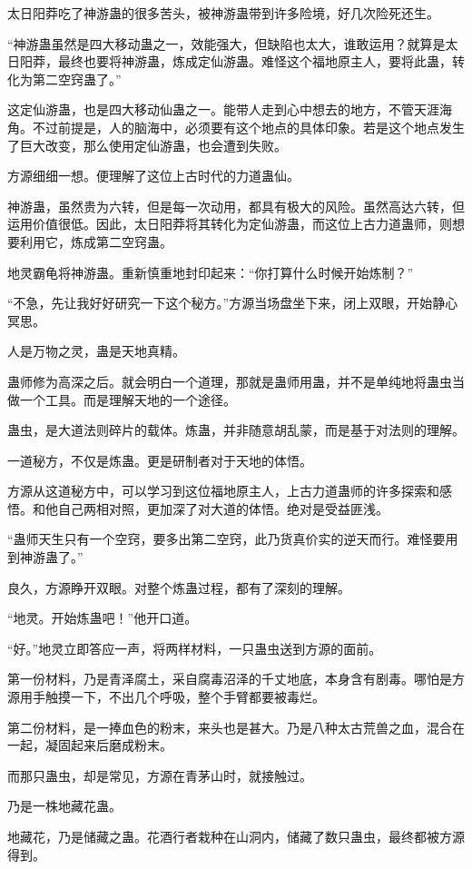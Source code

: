 \begin{this_body}
太日阳莽吃了神游蛊的很多苦头，被神游蛊带到许多险境，好几次险死还生。

“神游蛊虽然是四大移动蛊之一，效能强大，但缺陷也太大，谁敢运用？就算是太日阳莽，最终也要将神游蛊，炼成定仙游蛊。难怪这个福地原主人，要将此蛊，转化为第二空窍蛊了。”

这定仙游蛊，也是四大移动仙蛊之一。能带人走到心中想去的地方，不管天涯海角。不过前提是，人的脑海中，必须要有这个地点的具体印象。若是这个地点发生了巨大改变，那么使用定仙游蛊，也会遭到失败。

方源细细一想。便理解了这位上古时代的力道蛊仙。

神游蛊，虽然贵为六转，但是每一次动用，都具有极大的风险。虽然高达六转，但运用价值很低。因此，太日阳莽将其转化为定仙游蛊，而这位上古力道蛊师，则想要利用它，炼成第二空窍蛊。

地灵霸龟将神游蛊。重新慎重地封印起来：“你打算什么时候开始炼制？”

“不急，先让我好好研究一下这个秘方。”方源当场盘坐下来，闭上双眼，开始静心冥思。

人是万物之灵，蛊是天地真精。

蛊师修为高深之后。就会明白一个道理，那就是蛊师用蛊，并不是单纯地将蛊虫当做一个工具。而是理解天地的一个途径。

蛊虫，是大道法则碎片的载体。炼蛊，并非随意胡乱蒙，而是基于对法则的理解。

一道秘方，不仅是炼蛊。更是研制者对于天地的体悟。

方源从这道秘方中，可以学习到这位福地原主人，上古力道蛊师的许多探索和感悟。和他自己两相对照，更加深了对大道的体悟。绝对是受益匪浅。

“蛊师天生只有一个空窍，要多出第二空窍，此乃货真价实的逆天而行。难怪要用到神游蛊了。”

良久，方源睁开双眼。对整个炼蛊过程，都有了深刻的理解。

“地灵。开始炼蛊吧！”他开口道。

“好。”地灵立即答应一声，将两样材料，一只蛊虫送到方源的面前。

第一份材料，乃是青泽腐土，采自腐毒沼泽的千丈地底，本身含有剧毒。哪怕是方源用手触摸一下，不出几个呼吸，整个手臂都要被毒烂。

第二份材料，是一捧血色的粉末，来头也是甚大。乃是八种太古荒兽之血，混合在一起，凝固起来后磨成粉末。

而那只蛊虫，却是常见，方源在青茅山时，就接触过。

乃是一株地藏花蛊。

地藏花，乃是储藏之蛊。花酒行者栽种在山洞内，储藏了数只蛊虫，最终都被方源得到。


\end{this_body}
